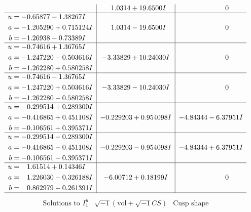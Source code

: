 \documentclass[1p]{elsarticle_modified}
\theoremstyle{definition}
\newcommand{\I}{\sqrt{-1}}
\begin{document}
$$\begin{array}{c|c|c}
 & \phantom{-}1.0314 + 19.6500 I & \phantom{-0.000000 } 0 \\ \hline\begin{aligned}
u &= -0.65877 - 1.38267 I \\
a &= -1.205290 + 0.715124 I \\
b &= -1.26938 - 0.73389 I\end{aligned}
 & \phantom{-}1.0314 - 19.6500 I & \phantom{-0.000000 } 0 \\ \hline\begin{aligned}
u &= -0.74616 + 1.36765 I \\
a &= -1.247220 - 0.503616 I \\
b &= -1.262280 + 0.580258 I\end{aligned}
 & -3.33829 + 10.24030 I & \phantom{-0.000000 } 0 \\ \hline\begin{aligned}
u &= -0.74616 - 1.36765 I \\
a &= -1.247220 + 0.503616 I \\
b &= -1.262280 - 0.580258 I\end{aligned}
 & -3.33829 - 10.24030 I & \phantom{-0.000000 } 0 \\ \hline\begin{aligned}
u &= -0.299514 + 0.289300 I \\
a &= -0.416865 + 0.451108 I \\
b &= -0.106561 + 0.395371 I\end{aligned}
 & -0.229203 + 0.954098 I & -4.84344 - 6.37951 I \\ \hline\begin{aligned}
u &= -0.299514 - 0.289300 I \\
a &= -0.416865 - 0.451108 I \\
b &= -0.106561 - 0.395371 I\end{aligned}
 & -0.229203 - 0.954098 I & -4.84344 + 6.37951 I \\ \hline\begin{aligned}
u &= \phantom{-}1.61514 + 0.14346 I \\
a &= \phantom{-}1.226030 - 0.326188 I \\
b &= \phantom{-}0.862979 - 0.261391 I\end{aligned}
 & -6.00712 + 0.18199 I & \phantom{-0.000000 } 0\\
 \hline 
 \end{array}$$\newpage$$\begin{array}{c|c|c}  
\text{Solutions to }I^u_{1}& \I (\text{vol} + \sqrt{-1}CS) & \text{Cusp shape}\\

\end{array}$$
\end{document}
